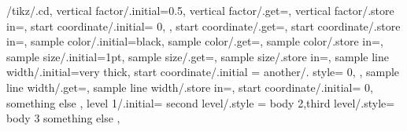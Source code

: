 \pgfkeys
{
	/tikz/.cd,
	vertical factor/.initial=0.5,
	vertical factor/.get=\vertfactor,
	vertical factor/.store in=\vertfactor,
	start coordinate/.initial=
	{
		0,\vertfactor
	}
	,
	start coordinate/.get=\startcoord,
	start coordinate/.store in=\startcoord,
	sample color/.initial=black,
	sample color/.get=\samplecol,
	sample color/.store in=\samplecol,
	sample size/.initial=1pt,
	sample size/.get=\samplesize,
	sample size/.store in=\samplesize,
	sample line width/.initial=very thick,
	start coordinate/.initial =
	{
		another/. style=
		{
			0,\vertfactor
		}
	}
	,
	sample line width/.get=\samplelinewidth,
	sample line width/.store in=\samplelinewidth,
	start coordinate/.initial=
	{
		0,\vertfactor
	}
	{
		something else
	}
	,
	level 1/.initial=
	{
		second level/.style =
		{
			body 2,third level/.style=
			{
				body 3
			}
		}
	}
	{
		something else
	}
	,
}
